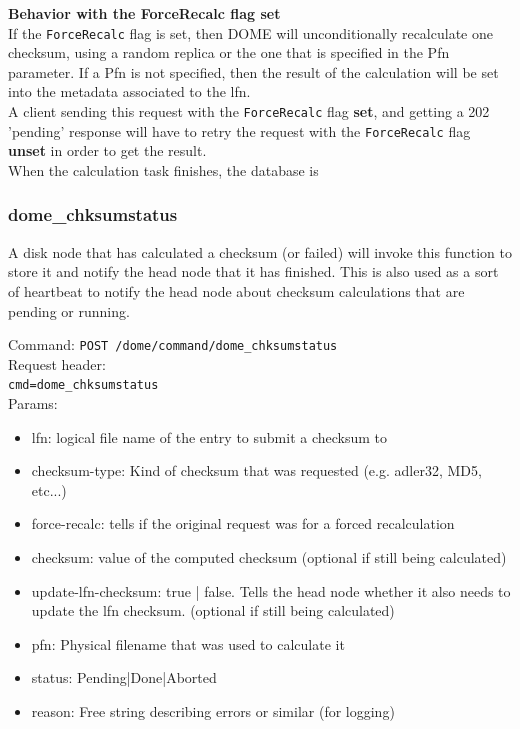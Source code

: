 \documentclass[a4paper,10pt]{scrreprt}
\begin{document}
\textbf{Behavior with the ForceRecalc flag set}\\

If the \lstinline"ForceRecalc" flag is set, then DOME will unconditionally recalculate one checksum, using a random replica or the one that is specified in the Pfn parameter.
If a Pfn is not specified, then the result of the calculation will be set into the metadata associated to the lfn.\\
A client sending this request with the  \lstinline"ForceRecalc" flag \textbf{set}, and getting a 202 'pending' response will have to retry the request with the \lstinline"ForceRecalc" flag \textbf{unset} in order to get the result.\\
When the calculation task finishes, the database is

\subsubsection{dome\_chksumstatus}
A disk node that has calculated a checksum (or failed) will invoke this function to store it and notify the head node that it has finished.
This is also used as a sort of heartbeat to notify the head node about checksum calculations that are pending or running.

Command:
\lstinline"POST /dome/command/dome_chksumstatus"\\

Request header:\\
\lstinline"cmd=dome_chksumstatus"\\

Params:
\begin{itemize}
 \item lfn: logical file name of the entry to submit a checksum to
 \item checksum-type: Kind of checksum that was requested (e.g. adler32, MD5, etc...)
 \item force-recalc: tells if the original request was for a forced recalculation
 \item checksum: value of the computed checksum (optional if still being calculated)
 \item update-lfn-checksum: true | false. Tells the head node whether it also needs to update the lfn checksum. (optional if still being calculated)
 \item pfn: Physical filename that was used to calculate it
 \item status: Pending|Done|Aborted
 \item reason: Free string describing errors or similar (for logging)
\end{itemize}
\end{document}
